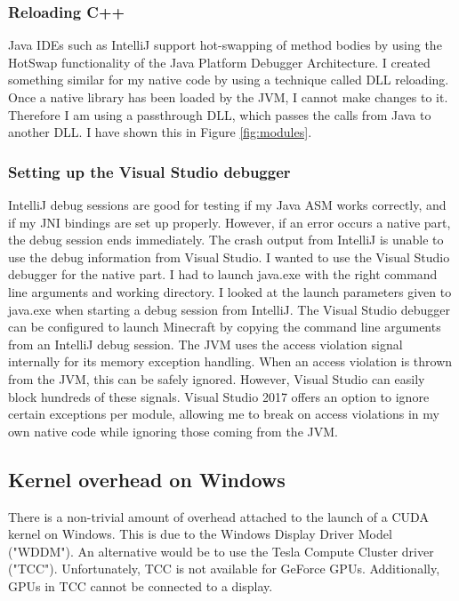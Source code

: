 \documentclass[]{article}
\begin{document}
\subsubsection{Reloading C++}
Java IDEs such as IntelliJ support hot-swapping of method bodies by using the HotSwap functionality of the Java Platform Debugger Architecture.
I created something similar for my native code by using a technique called DLL reloading.
Once a native library has been loaded by the JVM, I cannot make changes to it.
Therefore I am using a passthrough DLL, which passes the calls from Java to another DLL.
I have shown this in Figure \ref{fig:modules}.

\subsubsection{Setting up the Visual Studio debugger}
IntelliJ debug sessions are good for testing if my Java ASM works correctly, and if my JNI bindings are set up properly.
However, if an error occurs a native part, the debug session ends immediately.
The crash output from IntelliJ is unable to use the debug information from Visual Studio.
I wanted to use the Visual Studio debugger for the native part.
I had to launch java.exe with the right command line arguments and working directory.
I looked at the launch parameters given to java.exe when starting a debug session from IntelliJ.
The Visual Studio debugger can be configured to launch Minecraft by copying the command line arguments from an IntelliJ debug session.
The JVM uses the access violation signal internally for its memory exception handling.
When an access violation is thrown from the JVM, this can be safely ignored.
However, Visual Studio can easily block hundreds of these signals.
Visual Studio 2017 offers an option to ignore certain exceptions per module, allowing me to break on access violations in my own native code while ignoring those coming from the JVM.

\subsection{Kernel overhead on Windows}
There is a non-trivial amount of overhead attached to the launch of a CUDA kernel on Windows.
This is due to the Windows Display Driver Model ("WDDM").
An alternative would be to use the Tesla Compute Cluster driver ("TCC").
Unfortunately, TCC is not available for GeForce GPUs.
Additionally, GPUs in TCC cannot be connected to a display.
\end{document}
